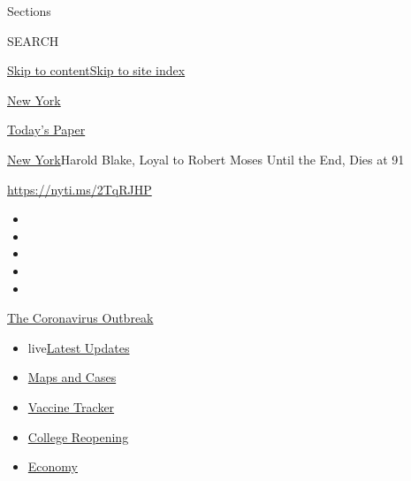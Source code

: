 Sections

SEARCH

\protect\hyperlink{site-content}{Skip to
content}\protect\hyperlink{site-index}{Skip to site index}

\href{https://www.nytimes3xbfgragh.onion/section/nyregion}{New York}

\href{https://myaccount.nytimes3xbfgragh.onion/auth/login?response_type=cookie\&client_id=vi}{}

\href{https://www.nytimes3xbfgragh.onion/section/todayspaper}{Today's
Paper}

\href{/section/nyregion}{New York}\textbar{}Harold Blake, Loyal to
Robert Moses Until the End, Dies at 91

\url{https://nyti.ms/2TqRJHP}

\begin{itemize}
\item
\item
\item
\item
\item
\end{itemize}

\href{https://www.nytimes3xbfgragh.onion/news-event/coronavirus?action=click\&pgtype=Article\&state=default\&region=TOP_BANNER\&context=storylines_menu}{The
Coronavirus Outbreak}

\begin{itemize}
\tightlist
\item
  live\href{https://www.nytimes3xbfgragh.onion/2020/08/04/world/coronavirus-covid-19.html?action=click\&pgtype=Article\&state=default\&region=TOP_BANNER\&context=storylines_menu}{Latest
  Updates}
\item
  \href{https://www.nytimes3xbfgragh.onion/interactive/2020/us/coronavirus-us-cases.html?action=click\&pgtype=Article\&state=default\&region=TOP_BANNER\&context=storylines_menu}{Maps
  and Cases}
\item
  \href{https://www.nytimes3xbfgragh.onion/interactive/2020/science/coronavirus-vaccine-tracker.html?action=click\&pgtype=Article\&state=default\&region=TOP_BANNER\&context=storylines_menu}{Vaccine
  Tracker}
\item
  \href{https://www.nytimes3xbfgragh.onion/2020/08/02/us/covid-college-reopening.html?action=click\&pgtype=Article\&state=default\&region=TOP_BANNER\&context=storylines_menu}{College
  Reopening}
\item
  \href{https://www.nytimes3xbfgragh.onion/live/2020/08/03/business/stock-market-today-coronavirus?action=click\&pgtype=Article\&state=default\&region=TOP_BANNER\&context=storylines_menu}{Economy}
\end{itemize}

